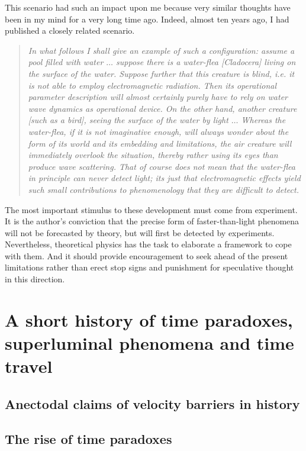 This scenario had such an impact upon me because
very similar thoughts have been in my mind for a very long time ago.
Indeed, almost ten years ago, I had published a closely related
scenario.

\begin{quote}
{\em
   In what follows I shall give an example of such a configuration:  assume a
pool filled  with water  $\ldots$ suppose  there is  a water-flea [Cladocera]
living on the surface  of the water.   Suppose further that this  creature is
blind, i.e. it  is not able  to employ electromagnetic  radiation.  Then  its
operational parameter description will  almost certainly purely have  to rely
on water wave  dynamics as operational  device.  On  the other hand,  another
creature [such as a bird], seeing the surface of the water by light  $\ldots$
Whereas the water-flea, if it  is not imaginative enough, will  always wonder
about  the  form  of  its  world  and  its embedding and limitations, the air
creature will immediately  overlook the situation,  thereby rather using  its
eyes than produce  wave scattering.   That of course  does not mean  that the
water-flea in principle can never detect light; its just that electromagnetic
effects  yield  such  small  contributions  to  phenomenology  that  they are
difficult to detect.
}
\end{quote}

   The  most  important  stimulus   to  these  development  must   come  from
experiment.    It  is  the  author's  conviction  that  the  precise  form of
faster-than-light phenomena will not be forecasted by theory, but will  first
be detected by experiments.   Nevertheless, theoretical physics has the  task
to  elaborate  a  framework  to  cope  with  them.    And  it  should provide
encouragement to seek ahead of the present limitations rather than erect stop
signs and punishment for speculative thought in this direction.






\chapter{A short history of time paradoxes, superluminal phenomena and
time travel}
\section{Anectodal claims of velocity barriers in history}
\section{The rise of time paradoxes}
